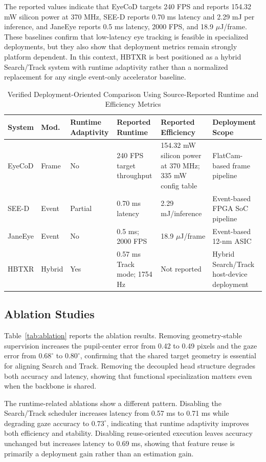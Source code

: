 \documentclass[journal]{IEEEtran}
\begin{document}
The reported values indicate that EyeCoD targets 240 FPS and reports 154.32 mW silicon power at 370 MHz, SEE-D reports 0.70 ms latency and 2.29 mJ per inference, and JaneEye reports 0.5 ms latency, 2000 FPS, and 18.9 $\mu$J/frame. These baselines confirm that low-latency eye tracking is feasible in specialized deployments, but they also show that deployment metrics remain strongly platform dependent. In this context, HBTXR is best positioned as a hybrid Search/Track system with runtime adaptivity rather than a normalized replacement for any single event-only accelerator baseline.

\begin{table}[t]
\caption{Verified Deployment-Oriented Comparison Using Source-Reported Runtime and Efficiency Metrics}
\label{tab:deploy}
\centering
\footnotesize
\begin{tabular}{p{}p{}p{}p{}p{}p{}}
\toprule
System & Mod. & Runtime Adaptivity & Reported Runtime & Reported Efficiency & Deployment Scope \\
\midrule
EyeCoD & Frame & No & 240 FPS target throughput & 154.32 mW silicon power at 370 MHz; 335 mW config table & FlatCam-based frame pipeline \\
SEE-D & Event & Partial & 0.70 ms latency & 2.29 mJ/inference & Event-based FPGA SoC pipeline \\
JaneEye & Event & No & 0.5 ms; 2000 FPS & 18.9 $\mu$J/frame & Event-based 12-nm ASIC \\
HBTXR & Hybrid & Yes & 0.57 ms Track mode; 1754 Hz & Not reported & Hybrid Search/Track host-device deployment \\
\bottomrule
\end{tabular}
\end{table}

\subsection{Ablation Studies}
Table~\ref{tab:ablation} reports the ablation results. Removing geometry-stable supervision increases the pupil-center error from 0.42 to 0.49 pixels and the gaze error from $0.68^{\circ}$ to $0.80^{\circ}$, confirming that the shared target geometry is essential for aligning Search and Track. Removing the decoupled head structure degrades both accuracy and latency, showing that functional specialization matters even when the backbone is shared.

The runtime-related ablations show a different pattern. Disabling the Search/Track scheduler increases latency from 0.57 ms to 0.71 ms while degrading gaze accuracy to $0.73^{\circ}$, indicating that runtime adaptivity improves both efficiency and stability. Disabling reuse-oriented execution leaves accuracy unchanged but increases latency to 0.69 ms, showing that feature reuse is primarily a deployment gain rather than an estimation gain.
\end{document}
